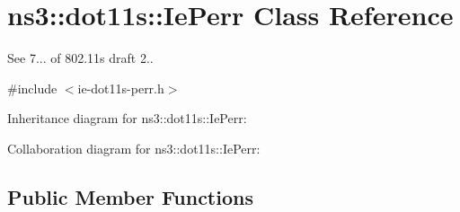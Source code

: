 \hypertarget{classns3_1_1dot11s_1_1IePerr}{}\section{ns3\+:\+:dot11s\+:\+:Ie\+Perr Class Reference}
\label{classns3_1_1dot11s_1_1IePerr}


See 7... of 802.\+11s draft 2..  




{\ttfamily \#include $<$ie-\/dot11s-\/perr.\+h$>$}



Inheritance diagram for ns3\+:\+:dot11s\+:\+:Ie\+Perr\+:


Collaboration diagram for ns3\+:\+:dot11s\+:\+:Ie\+Perr\+:
\subsection*{Public Member Functions}
